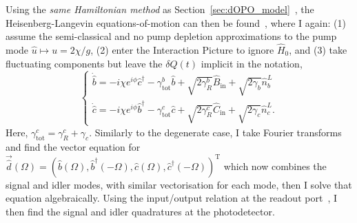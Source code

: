 Using the \emph{same Hamiltonian method} as Section~\ref{sec:dOPO_model}~\cite{}, the Heisenberg-Langevin equations-of-motion can then be found~\cite{}, where I again: (1) assume the semi-classical and no pump depletion approximations to the pump mode $\hat u\mapsto u=2\chi/g$, (2) enter the Interaction Picture to ignore $\hat H_0$, and (3) take fluctuating components but leave the $\delta \hat Q(t)$ implicit in the notation,
\begin{equation}\begin{cases}\label{eq:nOPO_EoM}
\dot{\hat{b}}=-i\chi e^{i\phi}\hat{c}^\dagger - \gamma^b_\mathrm{tot} \hat{b} + \sqrt{2\gamma^b_R}\hat{B}_\mathrm{in} + \sqrt{2\gamma_b}\hat{n}^L_b\\
\dot{\hat{c}}=-i\chi e^{i\phi}\hat{b}^\dagger - \gamma^c_\mathrm{tot} \hat{c} + \sqrt{2\gamma^c_R}\hat{C}_\mathrm{in} + \sqrt{2\gamma_c}\hat{n}^L_c.
\end{cases}\end{equation}
Here, $\gamma^c_\text{tot}=\gamma^c_R+\gamma_c$.
Similarly to the degenerate case, I take Fourier transforms and find the vector equation for $\vec{\hat d}(\Omega)=(\hat b(\Omega), \hat b^\dag(-\Omega), \hat c(\Omega), \hat c^\dag(-\Omega))^\text{T}$ which now combines the signal and idler modes, with similar vectorisation for each mode, then I solve that equation algebraically. Using the input/output relation at the readout port~\cite{}, I then find the signal and idler quadratures at the photodetector.

